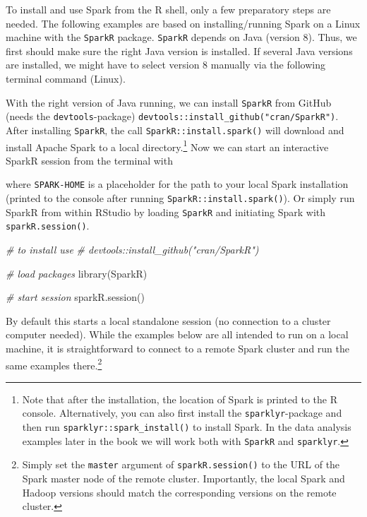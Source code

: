 \documentclass[
  12pt,
]{style/krantz}
\newenvironment{Shaded}{\begin{snugshade}}{\end{snugshade}}
\newcommand{\CommentTok}[1]{\textcolor[rgb]{0.56,0.35,0.01}{\textit{#1}}}
\newcommand{\ExtensionTok}[1]{#1}
\newcommand{\FunctionTok}[1]{\textcolor[rgb]{0.00,0.00,0.00}{#1}}
\newcommand{\NormalTok}[1]{#1}
\begin{document}
To install and use Spark from the R shell, only a few preparatory steps are needed. The following examples are based on installing/running Spark on a Linux machine with the \texttt{SparkR} package. \texttt{SparkR} depends on Java (version 8). Thus, we first should make sure the right Java version is installed. If several Java versions are installed, we might have to select version 8 manually via the following terminal command (Linux).

With the right version of Java running, we can install \texttt{SparkR} from GitHub (needs the \texttt{devtools}-package) \texttt{devtools::install\_github("cran/SparkR")}. After installing \texttt{SparkR}, the call \texttt{SparkR::install.spark()} will download and install Apache Spark to a local directory.\footnote{Note that after the installation, the location of Spark is printed to the R console. Alternatively, you can also first install the \texttt{sparklyr}-package and then run \texttt{sparklyr::spark\_install()} to install Spark. In the data analysis examples later in the book we will work both with \texttt{SparkR} and \texttt{sparklyr}.} Now we can start an interactive SparkR session from the terminal with

\begin{Shaded}
\end{Shaded}

where \texttt{SPARK-HOME} is a placeholder for the path to your local Spark installation (printed to the console after running \texttt{SparkR::install.spark()}). Or simply run SparkR from within RStudio by loading \texttt{SparkR} and initiating Spark with \texttt{sparkR.session()}.

\begin{Shaded}
\begin{Highlighting}[]
\CommentTok{\# to install use}
\CommentTok{\# devtools::install\_github("cran/SparkR")}

\CommentTok{\# load packages}
\FunctionTok{library}\NormalTok{(SparkR)}

\CommentTok{\# start session}
\FunctionTok{sparkR.session}\NormalTok{()}
\end{Highlighting}
\end{Shaded}

By default this starts a local standalone session (no connection to a cluster computer needed). While the examples below are all intended to run on a local machine, it is straightforward to connect to a remote Spark cluster and run the same examples there.\footnote{Simply set the \texttt{master} argument of \texttt{sparkR.session()} to the URL of the Spark master node of the remote cluster. Importantly, the local Spark and Hadoop versions should match the corresponding versions on the remote cluster.}
\end{document}
